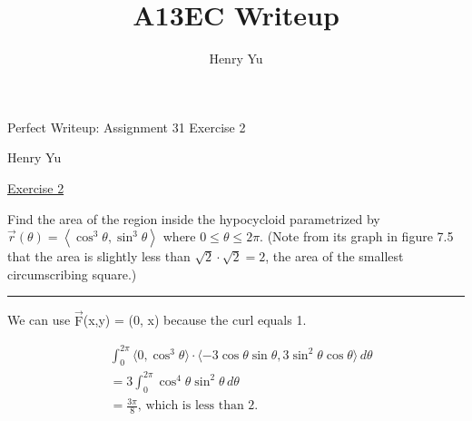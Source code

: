 \documentclass[12pt,a4paper]{article}
\author{Henry Yu}
\title{A13EC Writeup}
\begin{document}
\begin{titlepage}
	
	\begin{center}

		\vspace*{\fill}

    	\vspace*{0.5cm}
	
	    \huge{Perfect Writeup: Assignment 31 Exercise 2}
	
	    \vspace*{0.5cm}
	
	    \large{Henry Yu}
	
    	\vspace*{\fill}

	\end{center}

\end{titlepage}

\raggedright

\underline{Exercise 2}

\bigbreak

Find the area of the region inside the hypocycloid parametrized by $\vec{r}(\theta)=\left\langle\cos ^{3} \theta, \sin ^{3} \theta\right\rangle$ where $0 \leq \theta \leq 2 \pi$. (Note from its graph in figure 7.5 that the area is slightly less than $\sqrt{2} \cdot \sqrt{2}=2$, the area of the smallest circumscribing square.)

\vspace{0.5cm}
\hrule
\vspace{0.5cm}

We can use $\overrightarrow{\text{F}}$(x,y) = (0, x) because the curl equals 1.

\begin{align*}
	&\int_0^{2\pi}\langle0,\cos^3\theta\rangle\cdot\langle-3\cos\theta\sin\theta,3\sin^2\theta\cos\theta\rangle\,{d}\theta \\
	&=3\int_0^{2\pi}\cos^4\theta\sin^2\theta\,{d}\theta \\
	&=\frac{3\pi}{8},\, \text{which is less than 2.}
\end{align*}
\end{document}
